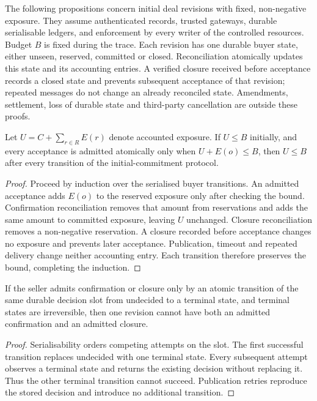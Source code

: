 The following propositions concern initial deal revisions with fixed, non-negative exposure. They assume authenticated records, trusted gateways, durable serialisable ledgers, and enforcement by every writer of the controlled resources. Budget $B$ is fixed during the trace. Each revision has one durable buyer state, either unseen, reserved, committed or closed. Reconciliation atomically updates this state and its accounting entries. A verified closure received before acceptance records a closed state and prevents subsequent acceptance of that revision; repeated messages do not change an already reconciled state. Amendments, settlement, loss of durable state and third-party cancellation are outside these proofs.

\begin{proposition}
\label{prop:budget-safety}
Let $U=C+\sum_{r\in R}E(r)$ denote accounted exposure. If $U\leq B$ initially, and every acceptance is admitted atomically only when $U+E(o)\leq B$, then $U\leq B$ after every transition of the initial-commitment protocol.
\end{proposition}
\begin{proof}
Proceed by induction over the serialised buyer transitions. An admitted acceptance adds $E(o)$ to the reserved exposure only after checking the bound. Confirmation reconciliation removes that amount from reservations and adds the same amount to committed exposure, leaving $U$ unchanged. Closure reconciliation removes a non-negative reservation. A closure recorded before acceptance changes no exposure and prevents later acceptance. Publication, timeout and repeated delivery change neither accounting entry. Each transition therefore preserves the bound, completing the induction.
\end{proof}

\begin{proposition}
\label{prop:terminal-exclusivity}
If the seller admits confirmation or closure only by an atomic transition of the same durable decision slot from undecided to a terminal state, and terminal states are irreversible, then one revision cannot have both an admitted confirmation and an admitted closure.
\end{proposition}
\begin{proof}
Serialisability orders competing attempts on the slot. The first successful transition replaces undecided with one terminal state. Every subsequent attempt observes a terminal state and returns the existing decision without replacing it. Thus the other terminal transition cannot succeed. Publication retries reproduce the stored decision and introduce no additional transition.
\end{proof}

